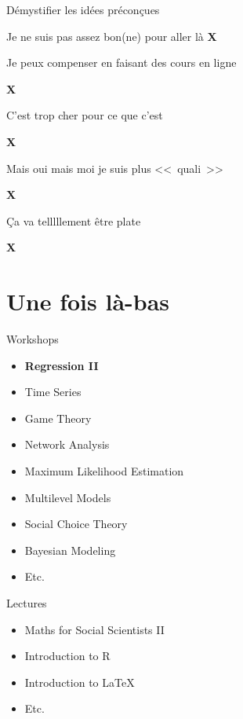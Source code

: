 \documentclass{beamer}
\begin{document}
\begin{frame}{Démystifier les idées préconçues}
\begin{itemize}
    \item Je ne suis pas assez bon(ne) pour aller là \Large{\textbf{\color{red}X}}
    \normalsize{\item Je peux compenser en faisant des cours en ligne} \Large{\textbf{\color{red}X}}
    \normalsize{\item C'est trop cher pour ce que c'est} \Large{\textbf{\color{red}X}}
    \normalsize{\item Mais oui mais moi je suis plus <<~quali~>>} \Large{\textbf{\color{red}X}}
     \normalsize{\item Ça va telllllement être plate} \Large{\textbf{\color{red}X}}
\end{itemize}
\end{frame}



\section{Une fois là-bas}

\begin{frame}{Workshops}
  \begin{itemize}
    \item \textbf{Regression II}
    \item Time Series
    \item Game Theory 
    \item Network Analysis
    \item Maximum Likelihood Estimation
    \item Multilevel Models 
    \item Social Choice Theory
    \item Bayesian Modeling 
    \item Etc. 
  \end{itemize}
\end{frame}

\begin{frame}{Lectures}
\begin{itemize}
    \item Maths for Social Scientists II
    \item Introduction to R 
    \item Introduction to LaTeX 
    \item Etc. 
  \end{itemize}
\end{frame}
\end{document}
